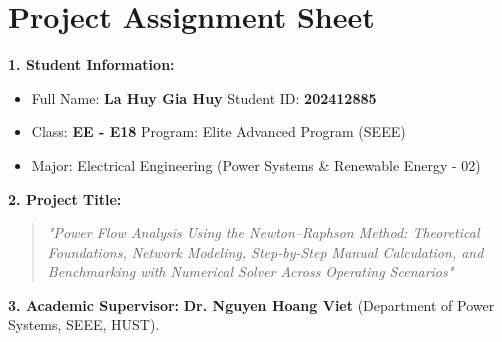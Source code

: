 \documentclass[12pt,a4paper,oneside]{report}
\begin{document}
\chapter*{Project Assignment Sheet}

\noindent \textbf{1. Student Information:}
\begin{itemize}
    \item Full Name: \textbf{La Huy Gia Huy} \hspace{2.5cm} Student ID: \textbf{202412885}
    \item Class: \textbf{EE - E18} \hspace{4cm} Program: Elite Advanced Program (SEEE)
    \item Major: Electrical Engineering (Power Systems \& Renewable Energy - 02)
\end{itemize}

\noindent \textbf{2. Project Title:}
\begin{quote}
\textit{"Power Flow Analysis Using the Newton--Raphson Method: Theoretical Foundations, Network Modeling, Step-by-Step Manual Calculation, and Benchmarking with Numerical Solver Across Operating Scenarios"}
\end{quote}

\noindent \textbf{3. Academic Supervisor:} \textbf{Dr. Nguyen Hoang Viet} (Department of Power Systems, SEEE, HUST).
\end{document}
